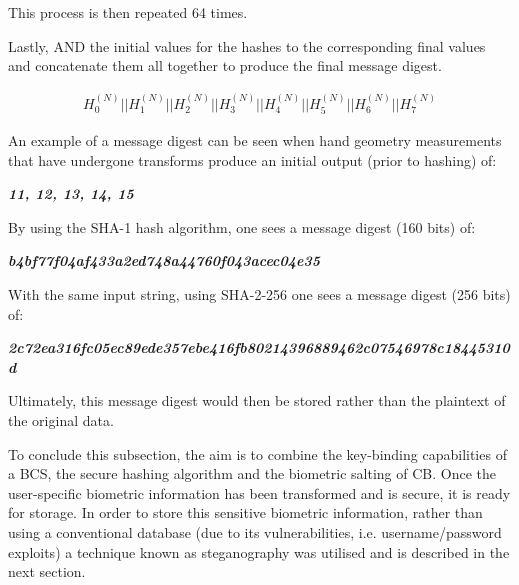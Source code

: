         This process is then repeated 64 times. 
        
        Lastly, AND the initial values for the hashes to the corresponding final values and concatenate them all together to produce the final message digest.
        
        
        \begin{gather}
            H^{(N)}_0 || H^{(N)}_1 ||H^{(N)}_2 || H^{(N)}_3 || H^{(N)}_4 || H^{(N)}_5 || H^{(N)}_6 || H^{(N)}_7 
        \end{gather} 
        
        An example of a message digest can be seen when hand geometry measurements that have undergone transforms produce an initial output (prior to hashing) of: 

        \begin{center}
            \textbf{\textit{11, 12, 13, 14, 15}}
        \end{center}
        
        By using the SHA-1 hash algorithm, one sees a message digest (160 bits) of:
        
        \begin{center}
            \textbf{\textit{b4bf77f04af433a2ed748a44760f043acec04e35}}
        \end{center}
        
        With the same input string, using SHA-2-256 one sees a message digest (256 bits) of:
        
        \begin{center}
            \textbf{\textit{2c72ea316fc05ec89ede357ebe416fb80214396889462c07546978c18445310d}}
        \end{center}
        
    

Ultimately, this message digest would then be stored rather than the plaintext of the original data.

To conclude this subsection, the aim is to combine the key-binding capabilities of a BCS, the secure hashing algorithm and the biometric salting of CB. Once the user-specific biometric information has been transformed and is secure, it is ready for storage. In order to store this sensitive biometric information, rather than using a conventional database (due to its vulnerabilities, i.e. username/password exploits) a technique known as steganography was utilised and is described in the next section. 


